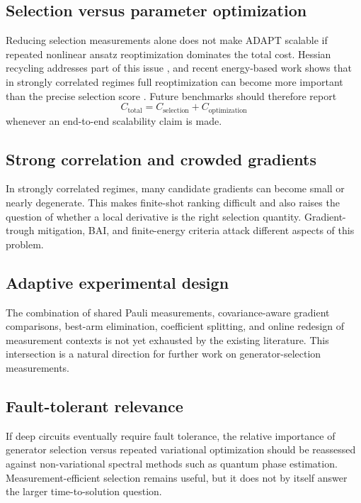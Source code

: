 \documentclass[11pt]{article}
\begin{document}
\subsection{Selection versus parameter optimization}
Reducing selection measurements alone does not make ADAPT scalable if repeated nonlinear ansatz reoptimization dominates the total cost. Hessian recycling addresses part of this issue \cite{Ramoa2025Hessian}, and recent energy-based work shows that in strongly correlated regimes full reoptimization can become more important than the precise selection score \cite{Rossi2026}. Future benchmarks should therefore report
\begin{equation}
    C_{\mathrm{total}}
    =C_{\mathrm{selection}}+C_{\mathrm{optimization}}
\end{equation}
whenever an end-to-end scalability claim is made.

\subsection{Strong correlation and crowded gradients}
In strongly correlated regimes, many candidate gradients can become small or nearly degenerate. This makes finite-shot ranking difficult and also raises the question of whether a local derivative is the right selection quantity. Gradient-trough mitigation, BAI, and finite-energy criteria attack different aspects of this problem.

\subsection{Adaptive experimental design}
The combination of shared Pauli measurements, covariance-aware gradient comparisons, best-arm elimination, coefficient splitting, and online redesign of measurement contexts is not yet exhausted by the existing literature. This intersection is a natural direction for further work on generator-selection measurements.

\subsection{Fault-tolerant relevance}
If deep circuits eventually require fault tolerance, the relative importance of generator selection versus repeated variational optimization should be reassessed against non-variational spectral methods such as quantum phase estimation. Measurement-efficient selection remains useful, but it does not by itself answer the larger time-to-solution question.
\end{document}

